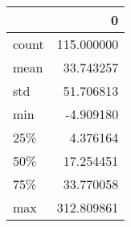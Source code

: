 \begin{tabular}{lr}
\toprule
{} &           0 \\
\midrule
count &  115.000000 \\
mean  &   33.743257 \\
std   &   51.706813 \\
min   &   -4.909180 \\
25\%   &    4.376164 \\
50\%   &   17.254451 \\
75\%   &   33.770058 \\
max   &  312.809861 \\
\bottomrule
\end{tabular}
